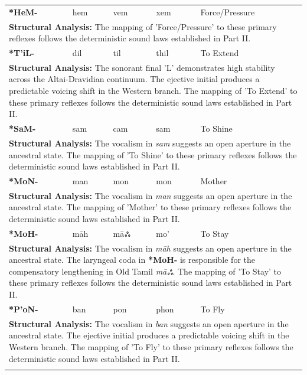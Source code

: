 \begin{longtable}{p{} p{} p{} p{} p{}}
\textbf{*HeM-} & hem & vem & xem & Force/Pressure \\ 
\multicolumn{5}{p{\textwidth}}{\small \textbf{Structural Analysis:}  The mapping of 'Force/Pressure' to these primary reflexes follows the deterministic sound laws established in Part II.} \\ \addlinespace[15pt] 
\textbf{*T'iL-} & dil & til & thil & To Extend \\ 
\multicolumn{5}{p{\textwidth}}{\small \textbf{Structural Analysis:} The sonorant final 'L' demonstrates high stability across the Altai-Dravidian continuum. The ejective initial produces a predictable voicing shift in the Western branch. The mapping of 'To Extend' to these primary reflexes follows the deterministic sound laws established in Part II.} \\ \addlinespace[15pt] 
\textbf{*SaM-} & sam & cam & sam & To Shine \\ 
\multicolumn{5}{p{\textwidth}}{\small \textbf{Structural Analysis:} The vocalism in \textit{sam} suggests an open aperture in the ancestral state. The mapping of 'To Shine' to these primary reflexes follows the deterministic sound laws established in Part II.} \\ \addlinespace[15pt] 
\textbf{*MoN-} & man & mon & mon & Mother \\ 
\multicolumn{5}{p{\textwidth}}{\small \textbf{Structural Analysis:} The vocalism in \textit{man} suggests an open aperture in the ancestral state. The mapping of 'Mother' to these primary reflexes follows the deterministic sound laws established in Part II.} \\ \addlinespace[15pt] 
\textbf{*MoH-} & māh & māஃ & mo' & To Stay \\ 
\multicolumn{5}{p{\textwidth}}{\small \textbf{Structural Analysis:} The vocalism in \textit{māh} suggests an open aperture in the ancestral state. The laryngeal coda in \textbf{*MoH-} is responsible for the compensatory lengthening in Old Tamil \textit{māஃ}. The mapping of 'To Stay' to these primary reflexes follows the deterministic sound laws established in Part II.} \\ \addlinespace[15pt] 
\textbf{*P'oN-} & ban & pon & phon & To Fly \\ 
\multicolumn{5}{p{\textwidth}}{\small \textbf{Structural Analysis:} The vocalism in \textit{ban} suggests an open aperture in the ancestral state. The ejective initial produces a predictable voicing shift in the Western branch. The mapping of 'To Fly' to these primary reflexes follows the deterministic sound laws established in Part II.} \\ \addlinespace[15pt] 

\end{longtable}
